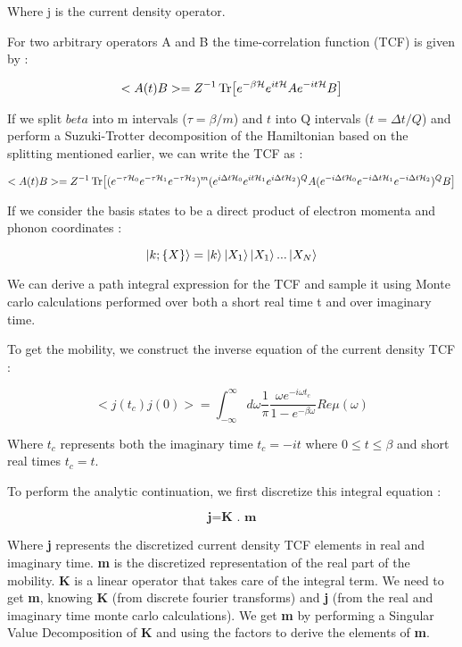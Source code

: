 Where j is the current density operator. 

For two arbitrary operators A and B the time-correlation function (TCF) is given by :

\begin{equation}
<A(t)B> = Z^{-1} \Tr[e^{-\beta \mathcal{H}} e^{it\mathcal{H}}Ae^{-it\mathcal{H}}B]
\end{equation}

If we split $beta$ into m intervals ($\tau = \beta/m$) and $t$ into Q intervals ($t= \Delta t/Q$) and perform a Suzuki-Trotter decomposition of the Hamiltonian based on the splitting mentioned earlier, we can write the TCF as :

\begin{equation}
<A(t)B> = Z^{-1} \Tr[(e^{-\tau \mathcal{H}_0}e^{-\tau \mathcal{H}_1}e^{-\tau \mathcal{H}_2})^m (e^{i\Delta t\mathcal{H}_0}e^{it\mathcal{H}_1}e^{i\Delta t\mathcal{H}_2})^QA(e^{-i \Delta t \mathcal{H}_0}e^{-i \Delta t \mathcal{H}_1}e^{-i \Delta t \mathcal{H}_2})^QB]
\end{equation}

If we consider the basis states to be a direct product of electron momenta and phonon coordinates :

\begin{equation}
    \ket{k;\{X\}} = \ket{k}\ket{X_1}\ket{X_1}...\ket{X_{N}}
\end{equation}

We can derive a path integral expression for the TCF and sample it using Monte carlo calculations performed over both a short real time t and over imaginary time.

To get the mobility, we construct the inverse equation of the current density TCF :

\begin{equation}
    <j(t_c)j(0)> = \int_{-\infty}^{\infty} d \omega \frac{1}{\pi} \frac{\omega e^{-i\omega t_c}}{1 - e^{-\beta \omega}} Re \mu(\omega)
\end{equation}

Where $t_c$ represents both the imaginary time $t_c = -it$ where $0 \leq t \leq \beta$ and short real times $t_c = t$.

To perform the analytic continuation, we first discretize this integral equation :

\begin{equation}
\textbf{j} = \textbf{K . m}
\end{equation}

Where \textbf{j} represents the discretized current density TCF elements in real and imaginary time. \textbf{m} is the discretized representation of the real part of the mobility. \textbf{K} is a linear operator that takes care of the integral term. We need to get \textbf{m}, knowing \textbf{K} (from discrete fourier transforms) and \textbf{j} (from the real and imaginary time monte carlo calculations). We get \textbf{m} by performing a Singular Value Decomposition of \textbf{K} and using the factors to derive the elements of \textbf{m}. 







